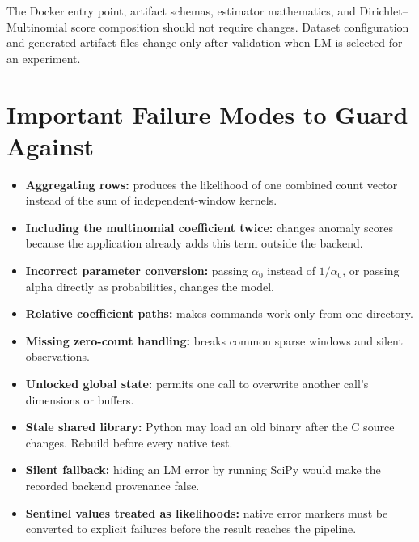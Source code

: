 \documentclass[11pt,a4paper]{article}
\begin{document}
The Docker entry point, artifact schemas, estimator mathematics, and
Dirichlet--Multinomial score composition should not require changes. Dataset
configuration and generated artifact files change only after validation when
LM is selected for an experiment.

\section{Important Failure Modes to Guard Against}

\begin{itemize}

\item \textbf{Aggregating rows:} produces the likelihood of one combined count
vector instead of the sum of independent-window kernels.

\item \textbf{Including the multinomial coefficient twice:} changes anomaly
scores because the application already adds this term outside the backend.

\item \textbf{Incorrect parameter conversion:} passing \(\alpha_0\) instead of
\(1/\alpha_0\), or passing alpha directly as probabilities, changes the model.

\item \textbf{Relative coefficient paths:} makes commands work only from one
directory.

\item \textbf{Missing zero-count handling:} breaks common sparse windows and
silent observations.

\item \textbf{Unlocked global state:} permits one call to overwrite another
call's dimensions or buffers.

\item \textbf{Stale shared library:} Python may load an old binary after the C
source changes. Rebuild before every native test.

\item \textbf{Silent fallback:} hiding an LM error by running SciPy would make
the recorded backend provenance false.

\item \textbf{Sentinel values treated as likelihoods:} native error markers
must be converted to explicit failures before the result reaches the pipeline.

\end{itemize}
\end{document}
